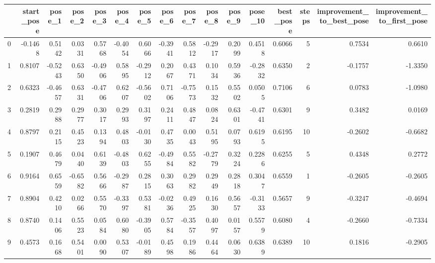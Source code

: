 \begin{tabular}{lrrrrrrrrrrrrrrr}
\toprule
{} &  start\_pose &  pose\_1 &  pose\_2 &  pose\_3 &  pose\_4 &  pose\_5 &  pose\_6 &  pose\_7 &  pose\_8 &  pose\_9 &  pose\_10 &  best\_pose &  steps &  improvement\_to\_best\_pose &  improvement\_to\_first\_pose \\
\midrule
0   &     -0.1468 &  0.5142 &  0.0331 &  0.5768 & -0.4054 &  0.6066 & -0.3941 &  0.5812 & -0.2917 &  0.2099 &   0.4518 &     0.6066 &      5 &                    0.7534 &                     0.6610 \\
1   &      0.8107 & -0.5243 &  0.6350 & -0.4906 &  0.5895 & -0.2912 &  0.2067 &  0.4371 &  0.1034 &  0.5936 &  -0.2832 &     0.6350 &      2 &                   -0.1757 &                    -1.3350 \\
2   &      0.6323 & -0.4657 &  0.6331 & -0.4706 &  0.6207 & -0.5602 &  0.7106 & -0.7573 &  0.1532 &  0.5502 &   0.0505 &     0.7106 &      6 &                    0.0783 &                    -1.0980 \\
3   &      0.2819 &  0.2988 &  0.2977 &  0.3017 &  0.2993 &  0.3197 &  0.2411 &  0.4847 &  0.0824 &  0.6301 &  -0.4741 &     0.6301 &      9 &                    0.3482 &                     0.0169 \\
4   &      0.8797 &  0.2115 &  0.4523 &  0.1394 &  0.4803 & -0.0130 &  0.4735 &  0.0043 &  0.5195 &  0.0793 &   0.6195 &     0.6195 &     10 &                   -0.2602 &                    -0.6682 \\
5   &      0.1907 &  0.4679 &  0.0440 &  0.6139 & -0.4803 &  0.6255 & -0.4984 &  0.5582 & -0.2779 &  0.3224 &   0.2286 &     0.6255 &      5 &                    0.4348 &                     0.2772 \\
6   &      0.9164 &  0.6559 & -0.6582 &  0.5666 & -0.2987 &  0.2815 &  0.3063 &  0.2982 &  0.2949 &  0.2818 &   0.3047 &     0.6559 &      1 &                   -0.2605 &                    -0.2605 \\
7   &      0.8904 &  0.4210 &  0.0266 &  0.5570 & -0.3397 &  0.5381 & -0.0236 &  0.4925 &  0.1630 &  0.5657 &  -0.3133 &     0.5657 &      9 &                   -0.3247 &                    -0.4694 \\
8   &      0.8740 &  0.1406 &  0.5523 &  0.0584 &  0.6080 & -0.3905 &  0.5784 & -0.3557 &  0.4097 &  0.0157 &   0.5579 &     0.6080 &      4 &                   -0.2660 &                    -0.7334 \\
9   &      0.4573 &  0.1668 &  0.5401 &  0.0090 &  0.5307 & -0.0189 &  0.4598 &  0.1986 &  0.4464 &  0.0630 &   0.6389 &     0.6389 &     10 &                    0.1816 &                    -0.2905 \\

\end{tabular}
